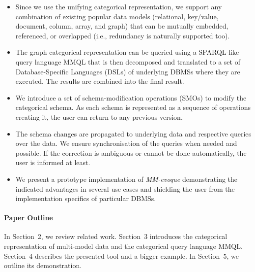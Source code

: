\begin{itemize}
    \item Since we use the unifying categorical representation, we support any combination of existing popular data models (relational,  key/value, document, column, array, and graph) that can be mutually embedded, referenced, or overlapped (i.e., redundancy is naturally supported too).   
    \item  The graph categorical representation can be queried using a SPARQL-like query language MMQL that is then decomposed and translated to a set of Database-Specific Languages (DSLs) of underlying DBMSs where they are executed. The results are combined into the final result.
    \item We introduce a set of schema-modification operations (SMOs) to modify the categorical schema. As each schema is represented as a sequence of operations creating it, the user can return to any previous version.
    \item The schema changes are propagated to underlying data and respective queries over the data. We ensure synchronisation of the queries when needed and possible. If the correction is ambiguous or cannot be done automatically, the user is informed at least.
    \item We present a prototype implementation of \textit{MM-evoque} demonstrating the indicated advantages in several use cases and shielding the user from the implementation specifics of particular DBMSs.
\end{itemize}



\paragraph{Paper Outline} In Section~2, we review related work. Section~3 introduces the categorical representation of multi-model data and the categorical query language MMQL. Section~4 describes the presented tool and a bigger example. In Section~5, we outline its demonstration.





